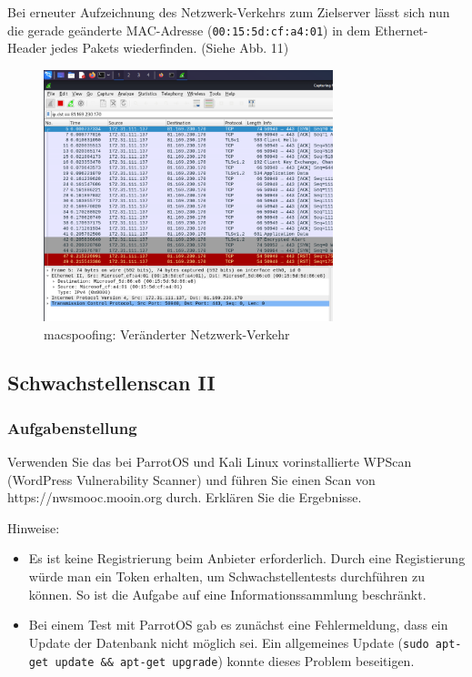 \documentclass{article}
\begin{document}
Bei erneuter Aufzeichnung des Netzwerk-Verkehrs zum Zielserver lässt sich nun die gerade geänderte 
MAC-Adresse (\texttt{00:15:5d:cf:a4:01}) in dem Ethernet-Header jedes Pakets wiederfinden.
(Siehe Abb. 11)

\begin{figure}[H]
	\includegraphics[width=0.75\textwidth]{images/11}
	\centering
	\caption{macspoofing: Veränderter Netzwerk-Verkehr}
\end{figure}

\newpage

\subsection{Schwachstellenscan II}

\subsubsection*{Aufgabenstellung}

Verwenden Sie das bei ParrotOS und Kali Linux vorinstallierte WPScan  (WordPress 
Vulnerability Scanner) und führen Sie einen Scan von https://nwsmooc.mooin.org durch. 
Erklären Sie die Ergebnisse.  

\begin{flushleft}
	Hinweise:	
\end{flushleft}


\begin{itemize}
	\item Es ist keine Registrierung beim Anbieter erforderlich. Durch eine Registierung würde man ein Token erhalten, um Schwachstellentests durchführen zu können. So ist die Aufgabe auf eine Informationssammlung beschränkt.
	\item Bei einem Test mit ParrotOS gab es zunächst eine Fehlermeldung, dass ein Update der Datenbank nicht möglich sei. Ein allgemeines Update
		(\texttt{sudo apt-get update \&\& apt-get upgrade}) konnte dieses Problem beseitigen.
\end{itemize}
\end{document}

